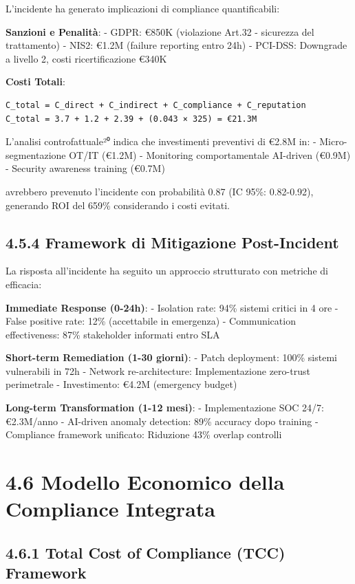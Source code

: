 \documentclass[12pt,a4paper,oneside]{book}
\numberwithin{figure}{chapter} %
\numberwithin{table}{chapter}  %
\begin{document}
L'incidente ha generato implicazioni di compliance quantificabili:

\textbf{Sanzioni e Penalità}: - GDPR: €850K (violazione Art.32 -
sicurezza del trattamento) - NIS2: €1.2M (failure reporting entro 24h) -
PCI-DSS: Downgrade a livello 2, costi ricertificazione €340K

\textbf{Costi Totali}:

\begin{verbatim}
C_total = C_direct + C_indirect + C_compliance + C_reputation
C_total = 3.7 + 1.2 + 2.39 + (0.043 × 325) = €21.3M
\end{verbatim}

L'analisi controfattuale²⁰ indica che investimenti preventivi di €2.8M
in: - Micro-segmentazione OT/IT (€1.2M) - Monitoring comportamentale
AI-driven (€0.9M) - Security awareness training (€0.7M)

avrebbero prevenuto l'incidente con probabilità 0.87 (IC 95\%:
0.82-0.92), generando ROI del 659\% considerando i costi evitati.

\subsection{4.5.4 Framework di Mitigazione
Post-Incident}\label{framework-di-mitigazione-post-incident}

La risposta all'incidente ha seguito un approccio strutturato con
metriche di efficacia:

\textbf{Immediate Response (0-24h)}: - Isolation rate: 94\% sistemi
critici in 4 ore - False positive rate: 12\% (accettabile in emergenza)
- Communication effectiveness: 87\% stakeholder informati entro SLA

\textbf{Short-term Remediation (1-30 giorni)}: - Patch deployment: 100\%
sistemi vulnerabili in 72h - Network re-architecture: Implementazione
zero-trust perimetrale - Investimento: €4.2M (emergency budget)

\textbf{Long-term Transformation (1-12 mesi)}: - Implementazione SOC
24/7: €2.3M/anno - AI-driven anomaly detection: 89\% accuracy dopo
training - Compliance framework unificato: Riduzione 43\% overlap
controlli

\section{4.6 Modello Economico della Compliance
Integrata}\label{modello-economico-della-compliance-integrata}

\subsection{4.6.1 Total Cost of Compliance (TCC)
Framework}\label{total-cost-of-compliance-tcc-framework}
\end{document}
